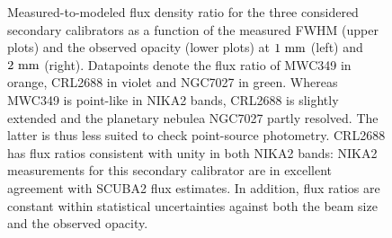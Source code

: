 \begin{figure}[ht!]
\begin{center}
    \caption[Flux density stability against observing conditions using
      secondary calibrators]{Measured-to-modeled flux density ratio
      for the three considered secondary calibrators as a function of
      the measured FWHM (upper plots) and the observed opacity
      (lower plots) at $1~\rm{mm}$ (left) and $2~\rm{mm}$ (right).
      Datapoints denote the flux ratio of MWC349 in orange, CRL2688 in
      violet and NGC7027 in green.
      Whereas MWC349 is point-like in NIKA2 bands, CRL2688 is slightly
      extended and the planetary nebulea NGC7027 partly resolved. The
      latter is thus less suited to check point-source
      photometry. CRL2688 has flux ratios consistent with unity in both
      NIKA2 bands: NIKA2 measurements for this secondary calibrator
      are in excellent agreement with SCUBA2 flux estimates. In
      addition, flux ratios are constant within statistical
      uncertainties against both the beam size and the observed
      opacity.}
    \label{fig:secondcalib_flux_1_2_mm}
  \end{center}
\end{figure}
